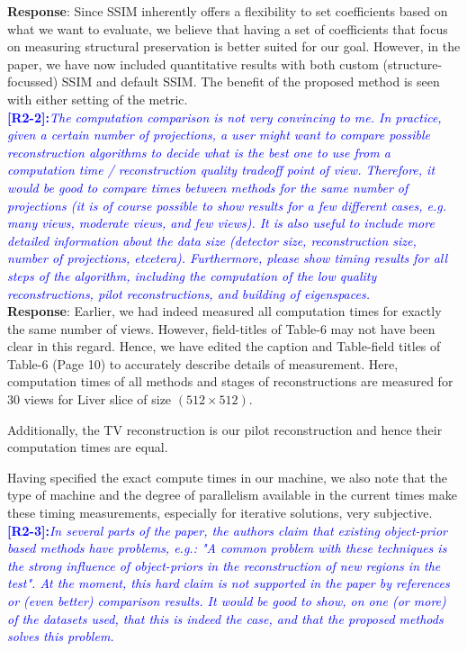 \documentclass{article}
\begin{document}
\textbf{Response}:
Since SSIM inherently offers a flexibility to set coefficients based on what we want to evaluate, we believe that having a set of coefficients that focus on measuring structural preservation is better suited for our goal. However, in the paper, we have now included quantitative results with both custom (structure-focussed) SSIM and default SSIM. The benefit of the proposed method is seen with either setting of the metric.\\


\textcolor{blue}{\textbf{[R2-2]:}\textit{The computation comparison is not very convincing to me. In practice, given a certain number of projections, a user might want to compare possible reconstruction algorithms to decide what is the best one to use from a computation time / reconstruction quality tradeoff point of view. Therefore, it would be good to compare times between methods for the same number of projections (it is of course possible to show results for a few different cases, e.g. many views, moderate views, and few views). It is also useful to include more detailed information about the data size (detector size, reconstruction size, number of projections, etcetera). Furthermore, please show timing results for all steps of the algorithm, including the computation of the low quality reconstructions, pilot reconstructions, and building of eigenspaces.}}\\

\textbf{Response}: Earlier, we had indeed measured all computation times for exactly the same number of views. However, field-titles of Table-6 may not have been clear in this regard. Hence, we have edited the caption and Table-field titles of Table-6 (Page 10) to accurately describe details of measurement. Here, computation times of all methods and stages of reconstructions are measured for 30 views for  Liver slice of size $(512 \times 512)$.

Additionally, the TV reconstruction is our pilot reconstruction and hence their computation times are equal.

Having specified the exact compute times in our machine, we also note that the type of machine and the degree of parallelism available in the current times make these timing measurements, especially for iterative solutions, very subjective.
\\

\textcolor{blue}{\textbf{[R2-3]:}\textit{In several parts of the paper, the authors claim that existing object-prior based methods have problems, e.g.: "A common problem with these techniques is the strong influence of object-priors in the reconstruction of new regions in the test". At the moment, this hard claim is not supported in the paper by references or (even better) comparison results. It would be good to show, on one (or more) of the datasets used, that this is indeed the case, and that the proposed methods solves this problem.}}\\
\end{document}
